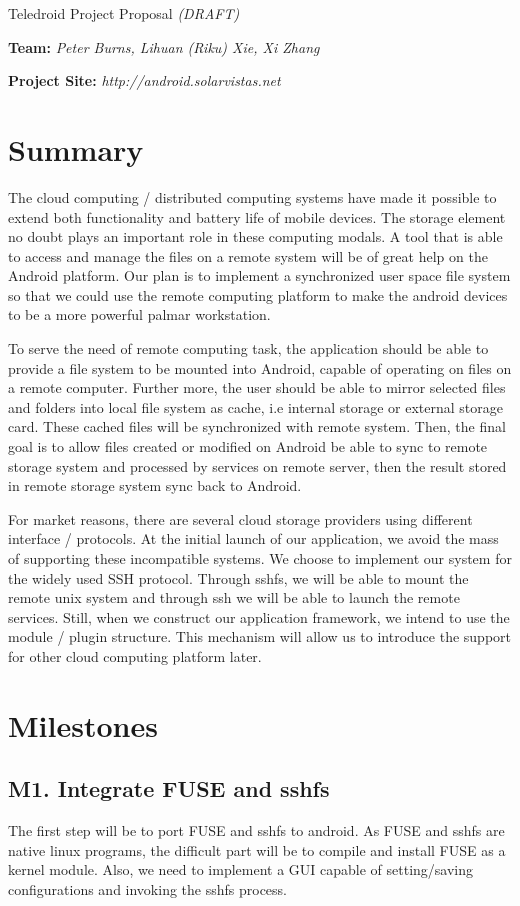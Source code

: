 \documentclass[letter,11pt] {article}
\begin{document}
\centerline{\sc \large Teledroid Project Proposal \emph{(DRAFT)} }
\centerline{\textbf{Team:} \emph{Peter Burns, Lihuan (Riku) Xie, Xi Zhang}}
\centerline{\textbf{Project Site:} \emph{http://android.solarvistas.net}}
\section{Summary}
The cloud computing / distributed computing systems have made it possible to extend both functionality and battery life of mobile devices. The storage element no doubt plays an important role in these computing modals. A tool that is able to access and manage the files on a remote system will be of great help on the Android platform. Our plan is to implement a synchronized user space file system so that we could use the remote computing platform to make the android devices to be a more powerful palmar workstation. 

To serve the need of remote computing task, the application should be able to provide a file system to be mounted into Android, capable of operating on files on a remote computer. Further more, the user should be able to mirror selected files and folders into local file system as cache, i.e internal storage or external storage card. These cached files will be synchronized with remote system. Then, the final goal is to allow files created or modified on Android be able to sync to remote storage system and processed by services on remote server, then the result stored in remote storage system sync back to Android.

For market reasons, there are several cloud storage providers using different interface / protocols. At the initial launch of our application, we avoid the mass of supporting these incompatible systems. We choose to implement our system for the widely used SSH protocol. Through sshfs, we will be able to mount the remote unix system and through ssh we will be able to launch the remote services. Still, when we construct our application framework, we intend to use the module / plugin structure. This mechanism will allow us to introduce the support for other cloud computing platform later.

\section{Milestones}

\subsection*{M1. Integrate FUSE and sshfs}
The first step will be to port FUSE and sshfs to android. As FUSE and sshfs are native linux programs, the difficult part will be to compile and install FUSE as a kernel module. Also, we need to implement a GUI capable of setting/saving configurations and invoking the sshfs process.
\end{document}
